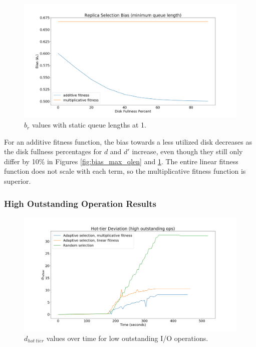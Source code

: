 \documentclass[12pt]{article}
\begin{document}
    \begin{figure}[htbp]
      \centering
      \includegraphics[scale=0.32]{images/replica_selection_bias_min_qlen.png} 
      \caption{$b_r$ values with static queue lengths at 1.}
      \label{fig:bias_min_qlen}
    \end{figure}

    For an additive fitness function, the bias towards a less utilized disk
    decreases as the disk fullness percentages for $d$ and $d'$ increase, even
    though they still only differ by 10\% in Figures \ref{fig:bias_max_qlen}
    and \ref{fig:bias_min_qlen}. The entire linear fitness function does not
    scale with each term, so the multiplicative fitness function is superior.

    \subsubsection{High Outstanding Operation Results}
    \label{sec:high-outstanding-ops}

    \begin{figure}[htbp]
      \centering
      \includegraphics[scale=0.32]{images/high_outstanding_exp.png} 
      \caption{$d_{hot\ tier}$ values over time for low outstanding I/O
               operations.}
      \label{fig:high_outstanding_tier_disparity}
    \end{figure}
\end{document}
